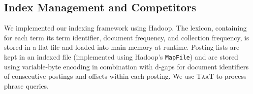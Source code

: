 
\subsection{Index Management and Competitors} 

We implemented our indexing framework
using Hadoop. The lexicon, containing for each term its term
identifier, document frequency, and collection frequency, is stored in
a flat file and loaded into main memory at runtime. Posting lists are
kept in an indexed file (implemented using Hadoop's \texttt{MapFile})
and are stored using variable-byte encoding in combination with d-gaps
for document identifiers of consecutive postings and offsets within
each posting. We use \textsc{TaaT} to process phrase queries.

